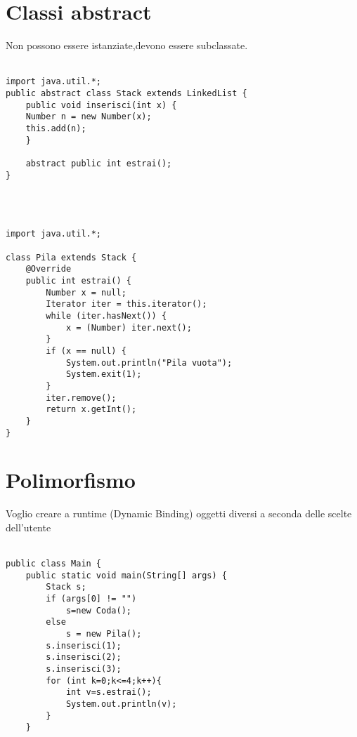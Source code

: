 \documentclass[10pt,a4paper]{article}
\begin{document}
\section{Classi abstract}
Non possono essere istanziate,devono essere subclassate.\\\\
\begin{verbatim}
import java.util.*;
public abstract class Stack extends LinkedList {
    public void inserisci(int x) {
    Number n = new Number(x);
    this.add(n);
    }

    abstract public int estrai();
}

\end{verbatim}
\\\\
\begin{verbatim}
import java.util.*;

class Pila extends Stack {
    @Override
    public int estrai() {
        Number x = null;
        Iterator iter = this.iterator();
        while (iter.hasNext()) {
            x = (Number) iter.next();
        }
        if (x == null) {
            System.out.println("Pila vuota");
            System.exit(1);
        }
        iter.remove();
        return x.getInt();
    }
}

\end{verbatim}
\newpage
\section{Polimorfismo}
Voglio creare a runtime (Dynamic Binding) oggetti diversi a seconda delle scelte dell'utente\\\\
\begin{verbatim}
public class Main {
    public static void main(String[] args) {
        Stack s;
        if (args[0] != "")
            s=new Coda();
        else
            s = new Pila();
        s.inserisci(1);
        s.inserisci(2);
        s.inserisci(3);
        for (int k=0;k<=4;k++){
            int v=s.estrai();
            System.out.println(v);
        }
    }

\end{verbatim}
\newpage
\end{document}
